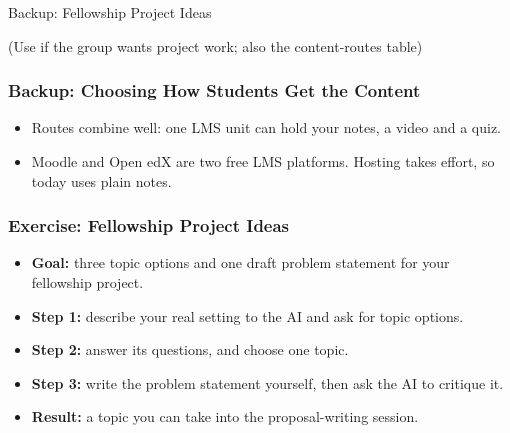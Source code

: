 \begin{frame}[fragile]\frametitle{}
\begin{center}
{\Large Backup: Fellowship Project Ideas}

\medskip
{\small (Use if the group wants project work; also the content-routes table)}
\end{center}
\end{frame}

\begin{frame}[fragile]\frametitle{Backup: Choosing How Students Get the Content}
\begin{center}
\end{center}
\begin{itemize}
\item Routes combine well: one LMS unit can hold your notes, a video and a quiz.
\item Moodle and Open edX are two free LMS platforms. Hosting takes effort, so today uses plain notes.
\end{itemize}
\end{frame}

\begin{frame}[fragile]\frametitle{Exercise: Fellowship Project Ideas}
\begin{itemize}
\item \textbf{Goal:} three topic options and one draft problem statement for your fellowship project.
\item \textbf{Step 1:} describe your real setting to the AI and ask for topic options.
\item \textbf{Step 2:} answer its questions, and choose one topic.
\item \textbf{Step 3:} write the problem statement yourself, then ask the AI to critique it.
\item \textbf{Result:} a topic you can take into the proposal-writing session.
\end{itemize}
\end{frame}

